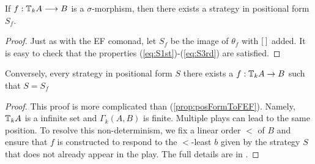 \begin{prop}
If $f:{\mathbb{T}_{k}A} \longrightarrow B$ is a $\sigma$-morphism, then there exists a strategy in positional form $S_{f}$.
\begin{proof}
Just as with the EF comonad, let $S_{f}$ be the image of $\theta_{f}$ with ${[\:]}$ added. It is easy to check that the properties (\ref{eq:S1st})-(\ref{eq:S3rd}) are satisfied.
\end{proof}
\label{prop:fToPosFormP}
\end{prop}
\begin{prop}
Conversely, every strategy in positional form $S$ there exists a $f:{\mathbb{T}_{k}A} \rightarrow B$ such that $S = S_{f}$
\begin{proof}
This proof is more complicated than (\ref{prop:posFormToFEF}). Namely, ${\mathbb{T}_{k}A}$ is a infinite set and $\Gamma_{k}(A,B)$ is finite. Multiple plays can lead to the same position. To resolve this non-determinism, we fix a linear order $<$ of $B$ and ensure that $f$ is constructed to respond to the $<$-least $b$ given by the strategy $S$ that does not already appear in the play. The full details are in \cite[Propostion 9]{Abramsky2017}.
\end{proof}
\label{prop:posFormToFP}
\end{prop}
